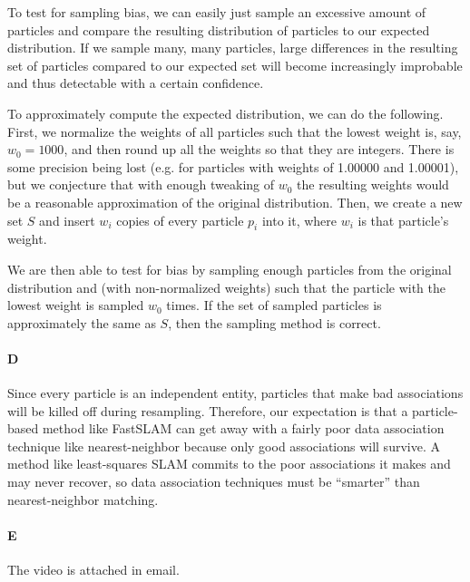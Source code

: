 \documentclass[12pt]{article}
\begin{document}
To test for sampling bias, we can easily just sample an excessive amount of
particles and compare the resulting distribution of particles to our
expected distribution. If we sample many, many particles, large differences
in the resulting set of particles compared to our expected set will become
increasingly improbable and thus detectable with a certain confidence.

To approximately compute the expected distribution, we can do the following. First, we normalize the weights
of all particles such that the lowest weight is, say, $w_0=1000$, and then round up all the weights so
that they are integers. There is some precision being lost (e.g. for particles with weights of 1.00000 and
1.00001), but we conjecture that with enough tweaking of $w_0$
the resulting weights would be
a reasonable approximation of the original distribution. Then, we create a new set $S$ and insert $w_i$
copies of every particle $p_i$ into it, where $w_i$ is that particle's weight.

We are then able to test for bias by sampling enough particles from the original distribution and 
(with non-normalized weights) such that the particle with the lowest weight is sampled $w_0$ times.
If the set of sampled particles is approximately the same as $S$, then the sampling method is correct.

\paragraph{D}
Since every particle is an independent entity, particles that make bad
associations will be killed off during resampling. Therefore, our
expectation is that a particle-based method like FastSLAM can get away
with a fairly poor data association technique like nearest-neighbor
because only good associations will survive. A method like least-squares
SLAM commits to the poor associations it makes and may never recover, so
data association techniques must be ``smarter'' than nearest-neighbor
matching.

\paragraph{E}
The video is attached in email.
\end{document}

